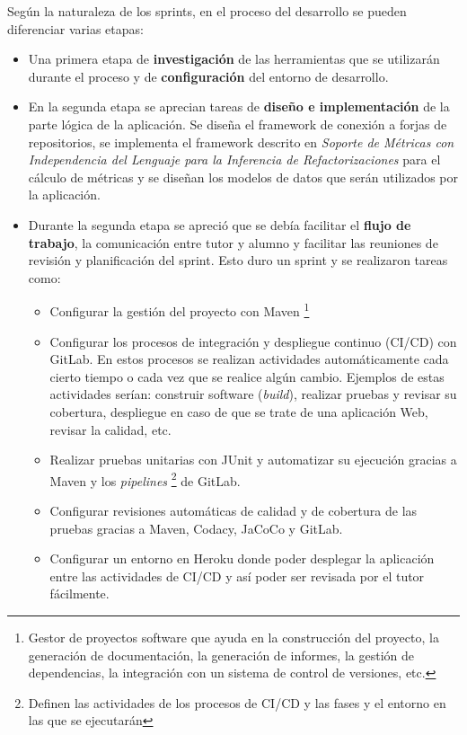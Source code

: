 Según la naturaleza de los sprints, en el proceso del desarrollo se pueden diferenciar varias etapas:
\begin{itemize}
	\item  Una primera etapa de \textbf{investigación} de las herramientas que se utilizarán durante el proceso y de \textbf{configuración} del entorno de desarrollo.
	\item En la segunda etapa se aprecian tareas de \textbf{diseño e implementación} de la parte lógica de la aplicación. Se diseña el framework de conexión a forjas de repositorios, se implementa el framework descrito en \textit{Soporte de Métricas con Independencia del Lenguaje para la Inferencia de Refactorizaciones}  \citep{marticorena_soporte_2005} para el cálculo de métricas y se diseñan los modelos de datos que serán utilizados por la aplicación.
	\item Durante la segunda etapa se apreció que se debía facilitar el \textbf{flujo de trabajo}, la comunicación entre tutor y alumno y facilitar las reuniones de revisión y planificación del sprint. Esto duro un sprint y se realizaron tareas como:
		\begin{itemize}
			\item Configurar la gestión del proyecto con Maven \footnote{Gestor de proyectos software que ayuda en la construcción del proyecto, la generación de documentación, la generación de informes, la gestión de dependencias, la integración con un sistema de control de versiones, etc.}
			\item Configurar los procesos de integración y despliegue continuo (CI/CD) con GitLab. En estos procesos se realizan actividades automáticamente cada cierto tiempo o cada vez que se realice algún cambio. Ejemplos de estas actividades serían: construir software (\textit{build}), realizar pruebas y revisar su cobertura, despliegue en caso de que se trate de una aplicación Web, revisar la calidad, etc.
			\item Realizar pruebas unitarias con JUnit y automatizar su ejecución gracias a Maven y los \textit{pipelines} \footnote{Definen las actividades de los procesos de CI/CD y las fases y el entorno en las que se ejecutarán} de GitLab.
			\item Configurar revisiones automáticas de calidad y de cobertura de las pruebas gracias a Maven, Codacy, JaCoCo y GitLab.
			\item Configurar un entorno en Heroku donde poder desplegar la aplicación entre las actividades de CI/CD y así poder ser revisada por el tutor fácilmente.

\end{itemize}
\end{itemize}
